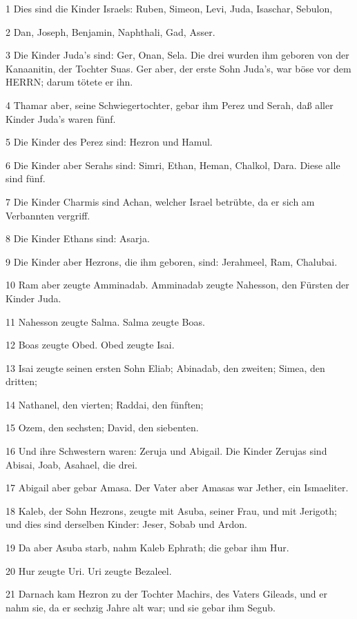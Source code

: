\par 1 Dies sind die Kinder Israels: Ruben, Simeon, Levi, Juda, Isaschar, Sebulon,
\par 2 Dan, Joseph, Benjamin, Naphthali, Gad, Asser.
\par 3 Die Kinder Juda's sind: Ger, Onan, Sela. Die drei wurden ihm geboren von der Kanaanitin, der Tochter Suas. Ger aber, der erste Sohn Juda's, war böse vor dem HERRN; darum tötete er ihn.
\par 4 Thamar aber, seine Schwiegertochter, gebar ihm Perez und Serah, daß aller Kinder Juda's waren fünf.
\par 5 Die Kinder des Perez sind: Hezron und Hamul.
\par 6 Die Kinder aber Serahs sind: Simri, Ethan, Heman, Chalkol, Dara. Diese alle sind fünf.
\par 7 Die Kinder Charmis sind Achan, welcher Israel betrübte, da er sich am Verbannten vergriff.
\par 8 Die Kinder Ethans sind: Asarja.
\par 9 Die Kinder aber Hezrons, die ihm geboren, sind: Jerahmeel, Ram, Chalubai.
\par 10 Ram aber zeugte Amminadab. Amminadab zeugte Nahesson, den Fürsten der Kinder Juda.
\par 11 Nahesson zeugte Salma. Salma zeugte Boas.
\par 12 Boas zeugte Obed. Obed zeugte Isai.
\par 13 Isai zeugte seinen ersten Sohn Eliab; Abinadab, den zweiten; Simea, den dritten;
\par 14 Nathanel, den vierten; Raddai, den fünften;
\par 15 Ozem, den sechsten; David, den siebenten.
\par 16 Und ihre Schwestern waren: Zeruja und Abigail. Die Kinder Zerujas sind Abisai, Joab, Asahael, die drei.
\par 17 Abigail aber gebar Amasa. Der Vater aber Amasas war Jether, ein Ismaeliter.
\par 18 Kaleb, der Sohn Hezrons, zeugte mit Asuba, seiner Frau, und mit Jerigoth; und dies sind derselben Kinder: Jeser, Sobab und Ardon.
\par 19 Da aber Asuba starb, nahm Kaleb Ephrath; die gebar ihm Hur.
\par 20 Hur zeugte Uri. Uri zeugte Bezaleel.
\par 21 Darnach kam Hezron zu der Tochter Machirs, des Vaters Gileads, und er nahm sie, da er sechzig Jahre alt war; und sie gebar ihm Segub.

